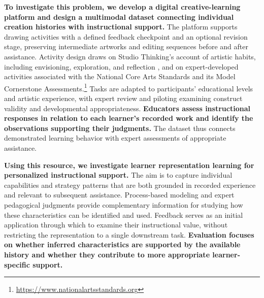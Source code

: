\textbf{To investigate this problem, we develop a digital creative-learning platform and design a multimodal dataset connecting individual creation histories with instructional support.} The platform supports drawing activities with a defined feedback checkpoint and an optional revision stage, preserving intermediate artworks and editing sequences before and after assistance. Activity design draws on Studio Thinking's account of artistic habits, including envisioning, exploration, and reflection \citep{hetland2013studio}, and on expert-developed activities associated with the National Core Arts Standards and its Model Cornerstone Assessments.\footnote{\url{https://www.nationalartsstandards.org}} Tasks are adapted to participants' educational levels and artistic experience, with expert review and piloting examining construct validity and developmental appropriateness. \textbf{Educators assess instructional responses in relation to each learner's recorded work and identify the observations supporting their judgments.} The dataset thus connects demonstrated learning behavior with expert assessments of appropriate assistance.

\textbf{Using this resource, we investigate learner representation learning for personalized instructional support.} The aim is to capture individual capabilities and strategy patterns that are both grounded in recorded experience and relevant to subsequent assistance. Process-based modeling and expert pedagogical judgments provide complementary information for studying how these characteristics can be identified and used. Feedback serves as an initial application through which to examine their instructional value, without restricting the representation to a single downstream task. \textbf{Evaluation focuses on whether inferred characteristics are supported by the available history and whether they contribute to more appropriate learner-specific support.}

